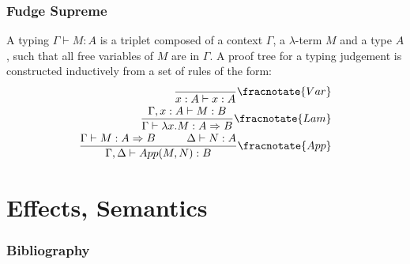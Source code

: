\documentclass[math, english, info, noamsthm]{beamercours}
\begin{document}
\begin{frame}
	\frametitle{Fudge Supreme}
\begin{definition}
	A typing $\Gamma\vdash M: A$ is a triplet composed of a context $\Gamma$, a $\lambda$-term $M$ and a type $A$, such that all free variables of $M$ are in $\Gamma$.
	A proof tree for a typing judgement is constructed inductively from a set of rules of the form:
	\begin{align*}
		\frac{}{x:A \vdash x:A}\fracnotate{Var}\\
		\frac{\Gamma, x:A\vdash M:B}{\Gamma\vdash \lambda x.M:A\Rightarrow B}\fracnotate{Lam}\\
		\frac{\Gamma\vdash M:A \Rightarrow B \hspace{1cm} \Delta \vdash N:A}{\Gamma, \Delta\vdash App(M, N):B}\fracnotate{App}
	\end{align*}
\end{definition}
\end{frame}

\section{Effects, Semantics}


\begin{frame}[allowframebreaks]
	\frametitle{Bibliography}


\end{frame}
\end{document}
